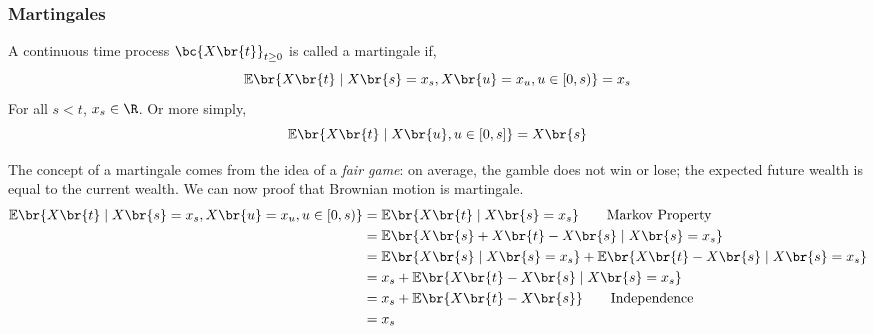 \documentclass{article}
\newcommand{\Exp}{\mathbb{E}}
\begin{document}
    \subsubsection{Martingales}
    \begin{definition}
        A continuous time process $\bc{X\br{t}}_{t \geq 0}$ is called a martingale if,
        \[ \Exp\br{X\br{t} \mid X\br{s} = x_s, X\br{u} = x_u, u \in \left[0, s\right)} = x_s \]
        For all $s < t$, $x_s \in \R$. Or more simply,
        \[ \Exp\br{X\br{t} \mid X\br{u}, u \in \left[0, s\right]} = X\br{s} \]
    \end{definition}
    The concept of a martingale comes from the idea of a \textit{fair game}: on average, the gamble does not win or lose; the expected future wealth is equal to the current wealth. We can now proof that Brownian motion is martingale.
    \begin{align*}
        \Exp\br{X\br{t} \mid X\br{s} = x_s, X\br{u} = x_u, u \in \left[0, s\right)}
        &= \Exp\br{X\br{t} \mid X\br{s} = x_s} \qquad \text{Markov Property} \\
        &= \Exp\br{X\br{s} + X\br{t} - X\br{s} \mid X\br{s} = x_s} \\
        &= \Exp\br{X\br{s} \mid X\br{s} = x_s} + \Exp\br{X\br{t} - X\br{s} \mid X\br{s} = x_s} \\
        &= x_s + \Exp\br{X\br{t} - X\br{s} \mid X\br{s} = x_s} \\
        &= x_s + \Exp\br{X\br{t} - X\br{s}} \qquad \text{Independence} \\
        &= x_s
    \end{align*}
\end{document}
